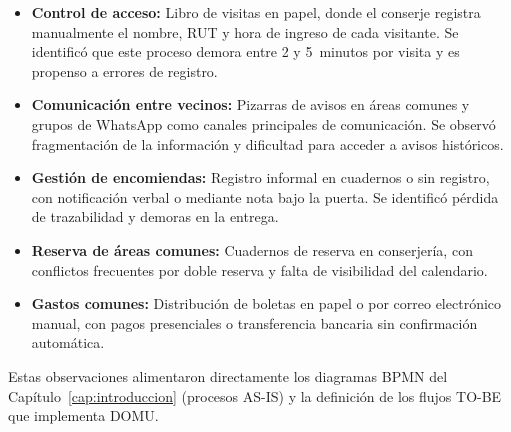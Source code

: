 \begin{itemize}
    \item \textbf{Control de acceso:} Libro de visitas en papel, donde el conserje registra manualmente el nombre, RUT y hora de ingreso de cada visitante. Se identificó que este proceso demora entre 2 y 5~minutos por visita y es propenso a errores de registro.

    \item \textbf{Comunicación entre vecinos:} Pizarras de avisos en áreas comunes y grupos de WhatsApp como canales principales de comunicación. Se observó fragmentación de la información y dificultad para acceder a avisos históricos.

    \item \textbf{Gestión de encomiendas:} Registro informal en cuadernos o sin registro, con notificación verbal o mediante nota bajo la puerta. Se identificó pérdida de trazabilidad y demoras en la entrega.

    \item \textbf{Reserva de áreas comunes:} Cuadernos de reserva en conserjería, con conflictos frecuentes por doble reserva y falta de visibilidad del calendario.

    \item \textbf{Gastos comunes:} Distribución de boletas en papel o por correo electrónico manual, con pagos presenciales o transferencia bancaria sin confirmación automática.
\end{itemize}

Estas observaciones alimentaron directamente los diagramas BPMN del Capítulo~\ref{cap:introduccion} (procesos AS-IS) y la definición de los flujos TO-BE que implementa DOMU.

